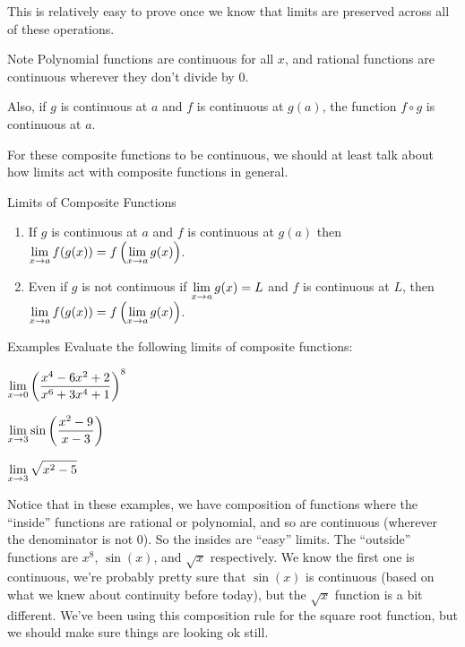 This is relatively easy to prove once we know that limits are preserved across all of these operations.

\begin{note}{Note}
  Polynomial functions are continuous for all $x$, and rational functions are continuous wherever they don't divide by 0.
\end{note}

Also, if $g$ is continuous at $a$ and $f$ is continuous at $g(a)$, the function $f\circ g$ is continuous at $a$.

For these composite functions to be continuous, we should at least talk about how limits act with composite functions in general.

\begin{thm}{Limits of Composite Functions}\hspace{1cm}
  \begin{enumerate}
    \item If $g$ is continuous at $a$ and $f$ is continuous at $g(a)$ then $\displaystyle \lim_{x\to a} f(g(x)) = f\left(\displaystyle \lim_{x\to a} g(x)\right)$.
    \item Even if $g$ is not continuous if $\displaystyle \lim_{x\to a} g(x)=L$ and $f$ is continuous at $L$, then $\displaystyle \lim_{x\to a}f(g(x))=f\left( \displaystyle \lim_{x\to a} g(x)\right)$.
  \end{enumerate}
\end{thm}

\begin{note}{Examples}
  Evaluate the following limits of composite functions:
  \begin{multicols}{3}
    $\displaystyle \lim_{x\to0} \left(\dfrac{x^4-6x^2+2}{x^6+3x^4+1}\right)^8$

    $\displaystyle \lim_{x\to3} \sin\left(\dfrac{x^2-9}{x-3}\right)$

    $\displaystyle \lim_{x\to3} \sqrt{x^2-5}$
  \end{multicols}
  Notice that in these examples, we have composition of functions where the ``inside'' functions are rational or polynomial, and so are continuous (wherever the denominator is not 0). So the insides are ``easy'' limits.
  The ``outside'' functions are $x^8$, $\sin(x)$, and $\sqrt{x}$ respectively.
  We know the first one is continuous, we're probably pretty sure that $\sin(x)$ is continuous (based on what we knew about continuity before today), but the $\sqrt{x}$ function is a bit different.
  We've been using this composition rule for the square root function, but we should make sure things are looking ok still.
\end{note}

